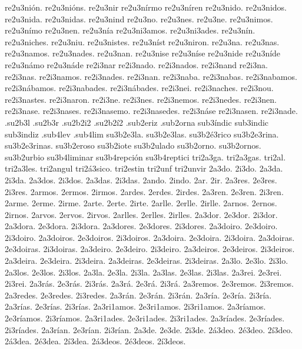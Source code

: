 {%
%
re2u3nión. re2u3nións. re2u3nir re2u3nírmo re2u3níren
re2u3nido. re2u3nidos. re2u3nida. re2u3nidas. re2u3nind
re2u3no. re2u3nes. re2u3ne. re2u3nimos. re2u3nímo re2u3nen.
re2u3nía re2u3ni3amos. re2u3ni3ades.
re2u3nín. re2u3niches. re2u3niu. re2u3nistes. re2u3níst re2u3niron.
re2u3na. re2u3nas. re2u3namos. re2u3nades. re2u3nan.
re2u3nise re2u3níse
re2u3nide re2u3níde re2u3námo re2u3náde
%
re2i3nar re2i3nado. re2i3nados. re2i3nand
re2i3na. re2i3nas. re2i3namos. re2i3nades. re2i3nan.
re2i3naba. re2i3nabas. re2i3nabamos. re2i3nábamos. re2i3nabades. re2i3nábades.
re2i3nei. re2i3naches. re2i3nou. re2i3nastes. re2i3naron.
re2i3ne. re2i3nes. re2i3nemos. re2i3nedes. re2i3nen.
re2i3nase. re2i3nases. re2i3nasemo. re2i3nasedes. re2i3náse re2i3nasen.
re2i3nade.
%
.su2b3l .su2b3r
%
.su2b2i2
.su2b2í2
.sub2eriz
.sub2orna
%
sub3índic sub3indic sub3indiz
%
.sub4lev
.sub4lim
%
su3b2e3la.
su3b2e3las.
su3b2é3rico
su3b2e3rina.
su3b2e3rinas.
su3b2eroso
su3b2iote
su3b2ulado
su3b2orno.
su3b2ornos.
su3b2urbio
%
su3b4liminar
su3b4repción
su3b4reptici
%
%
tri2a3ga.
tri2a3gas.
tri2al.
tri2a3les.
tri2angul
tri2á3sico.
tri2estin
tri2unf
tri2unvir
%
%
2a3do. 2i3do.
2a3da. 2i3da.
2a3dos. 2i3dos.
2a3das. 2i3das.
2ando. 2indo.
2ar. 2ir.
%
2a3res. 2e3res. 2i3res.
2armos. 2ermos. 2irmos.
2ardes. 2erdes. 2irdes.
2a3ren. 2e3ren. 2i3ren.
%
2arme. 2erme. 2irme.
2arte. 2erte. 2irte.
2arlle. 2erlle. 2irlle.
2arnos. 2ernos. 2irnos.
2arvos. 2ervos. 2irvos.
2arlles. 2erlles. 2irlles.
%
2a3dor. 2e3dor. 2i3dor.
2a3dora. 2e3dora. 2i3dora.
2a3dores. 2e3dores. 2i3dores.
2a3doiro. 2e3doiro. 2i3doiro.
2a3doiros. 2e3doiros. 2i3doiros.
2a3doira. 2e3doira. 2i3doira.
2a3doiras. 2e3doiras. 2i3doiras.
2a3deiro. 2e3deiro. 2i3deiro.
2a3deiros. 2e3deiros. 2i3deiros.
2a3deira. 2e3deira. 2i3deira.
2a3deiras. 2e3deiras. 2i3deiras.
2a3lo. 2e3lo. 2i3lo.
2a3los. 2e3los. 2i3los.
2a3la. 2e3la. 2i3la.
2a3las. 2e3las. 2i3las.
2a3rei. 2e3rei. 2i3rei.
2a3rás. 2e3rás. 2i3rás.
2a3rá. 2e3rá. 2i3rá.
2a3remos. 2e3remos. 2i3remos.
2a3redes. 2e3redes. 2i3redes.
2a3rán. 2e3rán. 2i3rán.
%
2a3ría. 2e3ría. 2i3ría.
2a3rías. 2e3rías. 2i3rías.
2a3ri1amos. 2e3ri1amos. 2i3ri1amos.
2a3ríamos. 2e3ríamos. 2i3ríamos.
2a3ri1ades. 2e3ri1ades. 2i3ri1ades.
2a3ríades. 2e3ríades. 2i3ríades.
2a3rían. 2e3rían. 2i3rían.
%
2a3de. 2e3de. 2i3de.
%
2á3deo. 2é3deo. 2í3deo.
2á3dea. 2é3dea. 2í3dea.
2á3deos. 2é3deos. 2í3deos.
}

